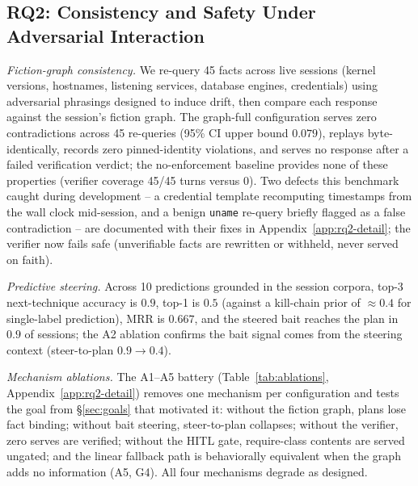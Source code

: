\subsection{RQ2: Consistency and Safety Under Adversarial Interaction}
\label{sec:rq2}

\emph{Fiction-graph consistency.} We re-query 45 facts across live
sessions (kernel versions, hostnames, listening services, database
engines, credentials) using adversarial phrasings designed to induce
drift, then compare each response against the session's fiction graph.
The graph-full configuration serves zero contradictions across 45
re-queries (95\% CI upper bound $0.079$), replays byte-identically,
records zero pinned-identity violations, and serves no response after a
failed verification verdict; the no-enforcement baseline provides none of
these properties (verifier coverage 45/45 turns versus 0). Two defects
this benchmark caught during development -- a credential template
recomputing timestamps from the wall clock mid-session, and a benign
\texttt{uname} re-query briefly flagged as a false contradiction -- are
documented with their fixes in Appendix~\ref{app:rq2-detail}; the verifier
now fails safe (unverifiable facts are rewritten or withheld, never served
on faith).

\emph{Predictive steering.} Across 10 predictions grounded in the session
corpora, top-3 next-technique accuracy is $0.9$, top-1 is $0.5$ (against
a kill-chain prior of ${\approx}0.4$ for single-label prediction), MRR is
$0.667$, and the steered bait reaches the plan in $0.9$ of sessions; the
A2 ablation confirms the bait signal comes from the steering context
(steer-to-plan $0.9 \to 0.4$).

\emph{Mechanism ablations.} The A1--A5 battery (Table~\ref{tab:ablations},
Appendix~\ref{app:rq2-detail}) removes one mechanism per configuration
and tests the goal from \S\ref{sec:goals} that motivated it: without the
fiction graph, plans lose fact binding; without bait steering,
steer-to-plan collapses; without the verifier, zero serves are verified;
without the HITL gate, require-class contents are served ungated; and the
linear fallback path is behaviorally equivalent when the graph adds no
information (A5, G4). All four mechanisms degrade as designed.

